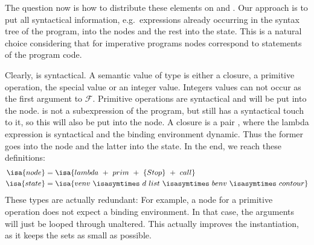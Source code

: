 \documentclass[a4paper,parskip=half,BCOR=8mm,DIV=calc,12pt]{scrbook}
\newcommand{\F}{\mathcal F}
\begin{document}
The question now is how to distribute these elements on  and . Our approach is to put all syntactical information, e.g.\ expressions already occurring in the syntax tree of the program, into the nodes and the rest into the state. This is a natural choice considering that for imperative programs nodes correspond to statements of the program code.

Clearly,  is syntactical. A semantic value of type  is either a closure, a primitive operation, the special value  or an integer value. Integers values can not occur as the first argument to $\F$. Primitive operations are syntactical and will be put into the node.  is not a subexpression of the program, but still has a syntactical touch to it, so this will also be put into the node. A closure is a pair , where the lambda expression is syntactical and the binding environment dynamic. Thus the former goes into the node and the latter into the state. In the end, we reach these definitions:
\begin{align*}
\isa{node} &= \isa{lambda\ +\ prim\ +\ \{Stop\}\ +\ call} \\
\isa{state} &= \isa{venv\ \isasymtimes\ d\ list\ \isasymtimes\ benv\ \isasymtimes\ contour}
\end{align*}
These types are actually redundant: For example, a node for a primitive operation does not expect a binding environment. In that case, the arguments will just be looped through unaltered. This actually improves the instantiation, as it keeps the  sets as small as possible.
\end{document}
